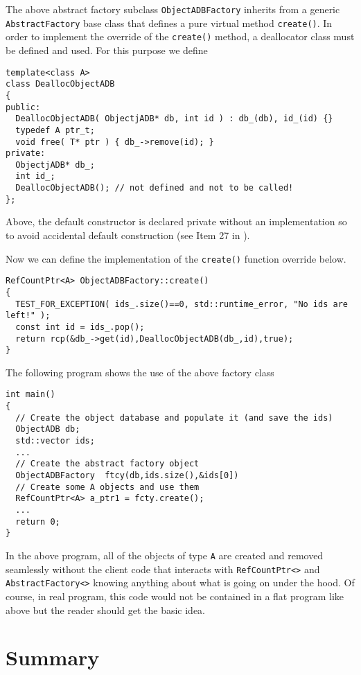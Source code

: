 The above abstract factory subclass {}\texttt{ObjectADBFactory}
inherits from a generic {}\texttt{AbstractFactory} base class that
defines a pure virtual method {}\texttt{create()}.  In order to
implement the override of the {}\texttt{create()} method, a
deallocator class must be defined and used.  For this purpose we
define

{\scriptsize\begin{verbatim}
template<class A>
class DeallocObjectADB
{
public:
  DeallocObjectADB( ObjectjADB* db, int id ) : db_(db), id_(id) {}
  typedef A ptr_t;
  void free( T* ptr ) { db_->remove(id); }
private:
  ObjectjADB* db_;
  int id_;
  DeallocObjectADB(); // not defined and not to be called!
};
\end{verbatim}}

{}\noindent{}Above, the default constructor is declared private
without an implementation so to avoid accidental default construction
(see Item 27 in {}\cite{ref:meyers_1994}).

Now we can define the implementation of the {}\texttt{create()} function
override below.

{\scriptsize\begin{verbatim}
RefCountPtr<A> ObjectADBFactory::create()
{
  TEST_FOR_EXCEPTION( ids_.size()==0, std::runtime_error, "No ids are left!" );
  const int id = ids_.pop();
  return rcp(&db_->get(id),DeallocObjectADB(db_,id),true);
}
\end{verbatim}}

The following program shows the use of the above factory class

{\scriptsize\begin{verbatim}
int main()
{
  // Create the object database and populate it (and save the ids)
  ObjectADB db;
  std::vector ids;
  ...
  // Create the abstract factory object
  ObjectADBFactory  ftcy(db,ids.size(),&ids[0])
  // Create some A objects and use them
  RefCountPtr<A> a_ptr1 = fcty.create();
  ...
  return 0;
}
\end{verbatim}}

In the above program, all of the objects of type {}\texttt{A} are
created and removed seamlessly without the client code that interacts
with {}\texttt{RefCountPtr<>} and {}\texttt{AbstractFactory<>} knowing
anything about what is going on under the hood.  Of course, in real
program, this code would not be contained in a flat program like above
but the reader should get the basic idea.

%
\section{Summary}
%

